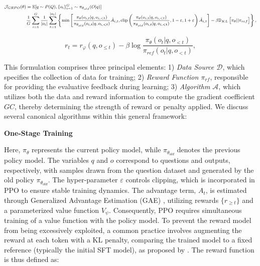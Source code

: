 {\begin{equation}
\footnotesize
\begin{split}
    \mathcal{J}_{GRPO}(\theta) &= \mathbb{E}{[q \sim P(Q), \{o_i\}_{i=1}^G \sim \pi_{\theta_{old}}(O|q)]}  \\
    & \frac{1}{G}\sum_{i=1}^G\frac{1}{|o_i|} \sum_{t=1}^{|o_i|} \left\{ \min \left[ \frac{\pi_\theta(o_{i,t} | q, o_{i,<t})}{\pi_{\theta_{old}}(o_{i,t} | q, o_{i,<t})} \hat{A}_{i,t}, \text{clip} \left( \frac{\pi_\theta(o_{i,t} | q, o_{i,<t})}{\pi_{\theta_{old}}(o_{i,t} | q, o_{i,<t})}, 1 - \varepsilon, 1 + \varepsilon \right)  \hat{A}_{i,t} \right] - \beta \mathbb{D}_{KL}\left[\pi_{\theta} || \pi_{ref}\right]\right\} ,
\end{split}
\label{eq:GRPO-obj}
\end{equation}

\begin{equation}
    r_{t} = r_\varphi(q, o_{\le t}) - \beta \log\frac{\pi_{\theta}(o_{t}|q, o_{<t})}{\pi_{ref}(o_{t}|q, o_{<t})},
\label{eq:PPO-reward}
\end{equation}

This formulation comprises three principal elements: 1) \textit{Data Source $\mathcal{D}$}, which specifies the collection of data for training; 2) \textit{Reward Function $\pi_{{rf}}$}, responsible for providing the evaluative feedback during learning; 3) \textit{Algorithm $\mathcal{A}$}, which utilizes both the data and reward information to compute the gradient coefficient $GC$, thereby determining the strength of reward or penalty applied. We discuss several canonical algorithms within this general framework:

\textbf{One-Stage Training}

Here, $\pi_{\theta}$ represents the current policy model, while $\pi_{\theta_{old}}$ denotes the previous policy model. The variables $q$ and $o$ correspond to questions and outputs, respectively, with samples drawn from the question dataset and generated by the old policy $\pi_{\theta_{old}}$. The hyper-parameter $\varepsilon$ controls clipping, which is incorporated in PPO to ensure stable training dynamics. The advantage term, $A_t$, is estimated through Generalized Advantage Estimation (GAE) \citep{gae}, utilizing rewards $\{r_{\ge t}\}$ and a parameterized value function $V_{\psi}$. Consequently, PPO requires simultaneous training of a value function with the policy model. To prevent the reward model from being excessively exploited, a common practice involves augmenting the reward at each token with a KL penalty, comparing the trained model to a fixed reference (typically the initial SFT model), as proposed by \citet{ouyang2022training}. The reward function is thus defined as:

}
